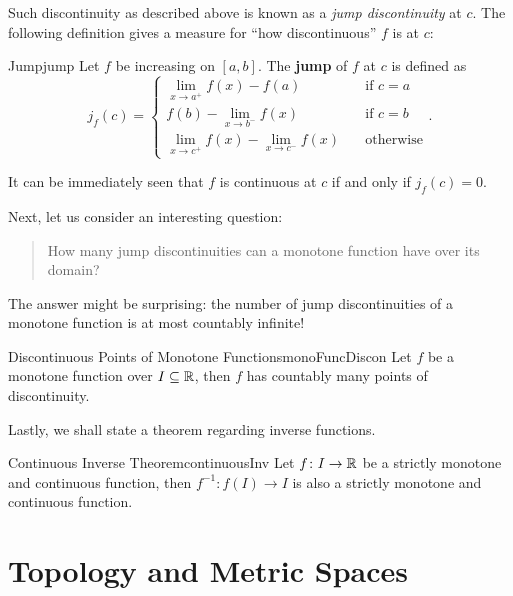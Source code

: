 \documentclass[math]{amznotes}
\theoremstyle{remark}
\begin{document}
Such discontinuity as described above is known as a \textit{jump discontinuity} at $c$. The following definition gives a measure for ``how discontinuous'' $f$ is at $c$:
\begin{dfnbox}{Jump}{jump}
    Let $f$ be increasing on $[a, b]$. The {\color{red} \textbf{jump}} of $f$ at $c$ is defined as
    \begin{equation*}
        j_f(c) = \begin{cases}
            \lim_{x \to a^+}f(x) - f(a) & \quad\textrm{if } c = a \\
            f(b) - \lim_{x \to b^-}f(x) & \quad\textrm{if } c = b \\
            \lim_{x \to c^+}f(x) - \lim_{x \to c^-}f(x) & \quad\textrm{otherwise}
        \end{cases}.
    \end{equation*}
\end{dfnbox}
It can be immediately seen that $f$ is continuous at $c$ if and only if $j_f(c) = 0$.

Next, let us consider an interesting question:
\begin{quote}
    How many jump discontinuities can a monotone function have over its domain?
\end{quote}
The answer might be surprising: the number of jump discontinuities of a monotone function is at most countably infinite!
\begin{thmbox}{Discontinuous Points of Monotone Functions}{monoFuncDiscon}
    Let $f$ be a monotone function over $I \subseteq \mathbb{R}$, then $f$ has countably many points of discontinuity.
\end{thmbox}
Lastly, we shall state a theorem regarding inverse functions.
\begin{thmbox}{Continuous Inverse Theorem}{continuousInv}
    Let $f \colon I \to \mathbb{R}$ be a strictly monotone and continuous function, then $f^{-1} \colon f(I) \to I$ is also a strictly monotone and continuous function.
\end{thmbox}

\chapter{Topology and Metric Spaces}
\end{document}

